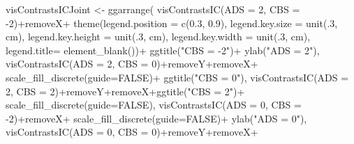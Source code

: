 \documentclass[
  10pt,
  dvipsnames,enabledeprecatedfontcommands]{scrartcl}
\newenvironment{Shaded}{\begin{snugshade}}{\end{snugshade}}
\newcommand{\AttributeTok}[1]{\textcolor[rgb]{0.77,0.63,0.00}{#1}}
\newcommand{\ConstantTok}[1]{\textcolor[rgb]{0.00,0.00,0.00}{#1}}
\newcommand{\DecValTok}[1]{\textcolor[rgb]{0.00,0.00,0.81}{#1}}
\newcommand{\FloatTok}[1]{\textcolor[rgb]{0.00,0.00,0.81}{#1}}
\newcommand{\FunctionTok}[1]{\textcolor[rgb]{0.00,0.00,0.00}{#1}}
\newcommand{\NormalTok}[1]{#1}
\newcommand{\OtherTok}[1]{\textcolor[rgb]{0.56,0.35,0.01}{#1}}
\newcommand{\SpecialCharTok}[1]{\textcolor[rgb]{0.00,0.00,0.00}{#1}}
\newcommand{\StringTok}[1]{\textcolor[rgb]{0.31,0.60,0.02}{#1}}
\begin{document}
\begin{Shaded}
\begin{Highlighting}[]
\NormalTok{visContrastsICJoint }\OtherTok{\textless{}{-}} \FunctionTok{ggarrange}\NormalTok{(}
\FunctionTok{visContrastsIC}\NormalTok{(}\AttributeTok{ADS =} \DecValTok{2}\NormalTok{, }\AttributeTok{CBS =} \SpecialCharTok{{-}}\DecValTok{2}\NormalTok{)}\SpecialCharTok{+}\NormalTok{removeX}\SpecialCharTok{+} 
               \FunctionTok{theme}\NormalTok{(}\AttributeTok{legend.position =} \FunctionTok{c}\NormalTok{(}\FloatTok{0.3}\NormalTok{, }\FloatTok{0.9}\NormalTok{),}
                     \AttributeTok{legend.key.size =} \FunctionTok{unit}\NormalTok{(.}\DecValTok{3}\NormalTok{, }\StringTok{\textquotesingle{}cm\textquotesingle{}}\NormalTok{),}
                     \AttributeTok{legend.key.height =} \FunctionTok{unit}\NormalTok{(.}\DecValTok{3}\NormalTok{, }\StringTok{\textquotesingle{}cm\textquotesingle{}}\NormalTok{),}
                     \AttributeTok{legend.key.width =} \FunctionTok{unit}\NormalTok{(.}\DecValTok{3}\NormalTok{, }\StringTok{\textquotesingle{}cm\textquotesingle{}}\NormalTok{),}
                     \AttributeTok{legend.title=} \FunctionTok{element\_blank}\NormalTok{())}\SpecialCharTok{+}
  \FunctionTok{ggtitle}\NormalTok{(}\StringTok{"CBS = {-}2"}\NormalTok{)}\SpecialCharTok{+}
  \FunctionTok{ylab}\NormalTok{(}\StringTok{"ADS = 2"}\NormalTok{),}
    \FunctionTok{visContrastsIC}\NormalTok{(}\AttributeTok{ADS =} \DecValTok{2}\NormalTok{, }\AttributeTok{CBS =} \DecValTok{0}\NormalTok{)}\SpecialCharTok{+}\NormalTok{removeY}\SpecialCharTok{+}\NormalTok{removeX}\SpecialCharTok{+} \FunctionTok{scale\_fill\_discrete}\NormalTok{(}\AttributeTok{guide=}\ConstantTok{FALSE}\NormalTok{)}\SpecialCharTok{+}
  \FunctionTok{ggtitle}\NormalTok{(}\StringTok{"CBS = 0"}\NormalTok{),}
    \FunctionTok{visContrastsIC}\NormalTok{(}\AttributeTok{ADS =} \DecValTok{2}\NormalTok{, }\AttributeTok{CBS =} \DecValTok{2}\NormalTok{)}\SpecialCharTok{+}\NormalTok{removeY}\SpecialCharTok{+}\NormalTok{removeX}\SpecialCharTok{+}\FunctionTok{ggtitle}\NormalTok{(}\StringTok{"CBS = 2"}\NormalTok{)}\SpecialCharTok{+} \FunctionTok{scale\_fill\_discrete}\NormalTok{(}\AttributeTok{guide=}\ConstantTok{FALSE}\NormalTok{),}
\FunctionTok{visContrastsIC}\NormalTok{(}\AttributeTok{ADS =} \DecValTok{0}\NormalTok{, }\AttributeTok{CBS =} \SpecialCharTok{{-}}\DecValTok{2}\NormalTok{)}\SpecialCharTok{+}\NormalTok{removeX}\SpecialCharTok{+} \FunctionTok{scale\_fill\_discrete}\NormalTok{(}\AttributeTok{guide=}\ConstantTok{FALSE}\NormalTok{)}\SpecialCharTok{+}
  \FunctionTok{ylab}\NormalTok{(}\StringTok{"ADS = 0"}\NormalTok{),}
    \FunctionTok{visContrastsIC}\NormalTok{(}\AttributeTok{ADS =} \DecValTok{0}\NormalTok{, }\AttributeTok{CBS =} \DecValTok{0}\NormalTok{)}\SpecialCharTok{+}\NormalTok{removeY}\SpecialCharTok{+}\NormalTok{removeX}\SpecialCharTok{+} 

\end{Highlighting}
\end{Shaded}
\end{document}
